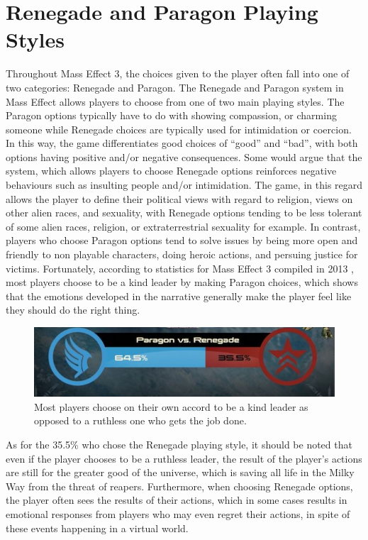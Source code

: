 \documentclass[journal]{IEEEtran}
\begin{document}
\section{Renegade and Paragon Playing Styles}
Throughout Mass Effect 3, the choices given to the player often fall into one
of two categories: Renegade and Paragon. The Renegade and Paragon system in
Mass Effect allows players to choose from one of two main playing styles.
The Paragon options typically have to do with showing compassion, or charming someone while Renegade choices are typically used for intimidation or coercion.
In this way, the game differentiates good choices of ``good'' and ``bad'',
with both options having positive and/or negative consequences.
Some would argue that the system, which allows players to choose Renegade options reinforces negative behaviours such as insulting people and/or intimidation. The game, in this regard allows the player to define their political views with regard to religion, views on other alien races,
and sexuality, with Renegade options tending to be less tolerant of some
alien races, religion, or extraterrestrial sexuality for example.
In contrast, players who choose Paragon options tend to solve issues by being more open and friendly to non playable characters, doing heroic actions, and
persuing justice for  victims. Fortunately, according to
statistics for Mass Effect 3 compiled in 2013 \cite{ea}, most players choose
to be a kind leader by making Paragon choices, which shows that the emotions
developed in the narrative generally make the player feel like they should
do the right thing.

\begin{figure}[h!]
 \centering
 \includegraphics[width=.485\textwidth]{paragon}
 \caption{Most players choose on their own accord to be a kind leader as opposed to a ruthless one who gets the job done. \cite{ea}}
\end{figure}

As for the 35.5\% who chose the Renegade playing style, it should be noted that even if the player chooses to be a ruthless leader, the result of the player's actions are still for the greater good of the universe, which is saving
all life in the Milky Way from the threat of reapers. Furthermore, when choosing Renegade options, the player often sees the results of their actions,
which in some cases results in emotional responses from players who may even regret their actions, in spite of these events happening in a virtual world.
\end{document}
